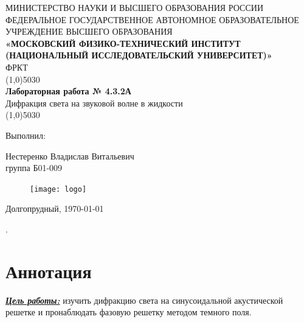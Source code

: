\documentclass[a4paper,12pt]{article} %
\theoremstyle{plain} %
\theoremstyle{definition} %
\theoremstyle{remark} %
\begin{document}
 
\begin{center}
\thispagestyle{empty} %
\hfill \break
{МИНИСТЕРСТВО НАУКИ И ВЫСШЕГО ОБРАЗОВАНИЯ РОССИИ}\\
\footnotesize{ФЕДЕРАЛЬНОЕ ГОСУДАРСТВЕННОЕ АВТОНОМНОЕ ОБРАЗОВАТЕЛЬНОЕ}\\ 
\footnotesize{УЧРЕЖДЕНИЕ ВЫСШЕГО ОБРАЗОВАНИЯ}\\
\small{\textbf{«МОСКОВСКИЙ ФИЗИКО-ТЕХНИЧЕСКИЙ ИНСТИТУТ (НАЦИОНАЛЬНЫЙ ИССЛЕДОВАТЕЛЬСКИЙ УНИВЕРСИТЕТ)»}}\\
\hfill \break
\normalsize{ФРКТ}\\
\hfill \break
\hfill \break
\hfill \break
\hfill \break
\hfill\break
\hfill\break
\line(1,0){5030}\\[1mm]
\Large\textbf{{Лабораторная работа № 4.3.2А}}\\
\Large{Дифракция света на звуковой волне в жидкости}\\
\line(1,0){5030}\\[1mm]
\hfill \break

\hfill \break
\end{center}
 
\begin{flushright}
{Выполнил:}

{{\Large Нестеренко Владислав Витальевич}}\\

{группа Б01-009}
\end{flushright}

\begin{figure}[H]
\centering
\texttt{[image: logo]}
\end{figure}
\begin{center} Долгопрудный,  \today \end{center}
\thispagestyle{empty} %
 

{\tiny .}
\thispagestyle{empty} %
\newpage

\section{Аннотация}

\noindent \underline{\textbf{\textit{Цель работы:}}} изучить дифракцию света на синусоидальной акустической решетке и пронаблюдать фазовую решетку методом темного поля.
\end{document}
